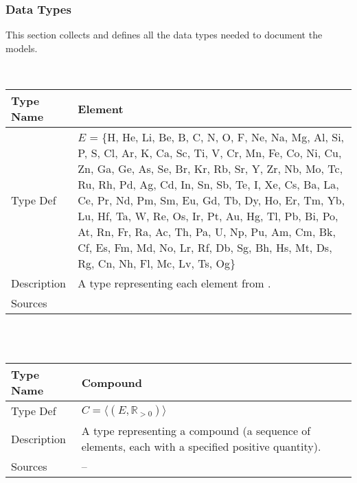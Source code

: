 \documentclass[12pt]{article}
\newcommand*{\posReal}{\mathbb{R}_{> 0}}
\newcommand{\colAwidth}{0.13\textwidth}
\newcommand{\colBwidth}{0.82\textwidth}
\begin{document}
\subsubsection{Data Types}\label{sec_datatypes}

This section collects and defines all the data types needed to document the
models.

~\newline
\noindent
\begin{minipage}{\textwidth}
  \renewcommand*{\arraystretch}{1.5}
  \begin{tabular}{| p{\colAwidth} | p{\colBwidth}|}
    \hline
    \rowcolor[gray]{0.9}
    Type Name   & Element                                                   \\
    \hline
    Type Def    & $E$ = \{H, He, Li, Be, B, C, N, O, F, Ne, Na, Mg, Al, Si,
    P, S, Cl, Ar, K, Ca, Sc, Ti, V, Cr, Mn, Fe, Co, Ni, Cu, Zn, Ga, Ge, As, Se,
    Br, Kr, Rb, Sr, Y, Zr, Nb, Mo, Tc, Ru, Rh, Pd, Ag, Cd, In, Sn, Sb, Te, I,
    Xe, Cs, Ba, La, Ce, Pr, Nd, Pm, Sm, Eu, Gd, Tb, Dy, Ho, Er, Tm, Yb, Lu, Hf,
    Ta, W, Re, Os, Ir, Pt, Au, Hg, Tl, Pb, Bi, Po, At, Rn, Fr, Ra, Ac, Th, Pa,
    U, Np, Pu, Am, Cm, Bk, Cf, Es, Fm, Md, No, Lr, Rf, Db, Sg, Bh, Hs, Mt, Ds,
    Rg, Cn, Nh, Fl, Mc, Lv, Ts, Og\}                                        \\

    \hline
    Description & A type representing each element from
    \cite{wikipedia_list_2023}.                                             \\
    \hline
    Sources     & \cite{smith_assignment_2020}                              \\
    \hline
  \end{tabular}
\end{minipage}\\
~\newline

\noindent
\begin{minipage}{\textwidth}
  \renewcommand*{\arraystretch}{1.5}
  \begin{tabular}{| p{\colAwidth} | p{\colBwidth}|}
    \hline
    \rowcolor[gray]{0.9}
    Type Name   & Compound                                                     \\
    \hline
    Type Def    & $C = \langle (E, \posReal) \rangle$                          \\

    \hline
    Description & A type representing a compound (a sequence of elements, each
    with a specified positive quantity).                                       \\
    \hline
    Sources     & --                                                           \\
    \hline
  \end{tabular}
\end{minipage}\\
\end{document}
